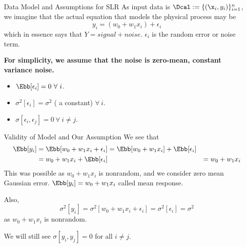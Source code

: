 \documentclass[aspectratio=169,xcolor=dvipsnames,svgnames,x11names,fleqn]{beamer}
\begin{document}
\begin{frame}{Data Model and Assumptions for SLR}
    As input data is $\Dcal:=\{(\x_i, y_i)\}_{i=1}^n$, we imagine that the actual equation that models the physical process may be 
    \begin{equation}
        y_i = (w_0 + w_1 x_i) + \epsilon_i
    \end{equation}
    which in essence says that $ Y = signal + noise$. $\epsilon_i$ is the random error or noise term.

\begin{gradblock}
        \textbf{For simplicity, we assume that the noise is zero-mean, constant variance noise.}
    \begin{itemize}
        \item $\Ebb[\epsilon_i] = 0 ~\forall~ i$.
        \item $\sigma^2[\epsilon_i] = \sigma^2$ ( a constant) $\forall~ i$.
        \item $\sigma[\epsilon_i, \epsilon_j] = 0~\forall~ i\neq j$.
    \end{itemize}
\end{gradblock}
\end{frame}

\begin{frame}{Validity of Model and Our Assumption}
    We see that 
    \begin{equation}
        \begin{aligned}
            \Ebb[y_i] & = \Ebb[w_0 + w_1x_i + \epsilon_i] = \Ebb[w_0 + w_1x_i] + \Ebb[\epsilon_i]\\
            & = w_0 + w_1x_i + \Ebb[\epsilon_i]
            & = w_0 + w_1x_i 
        \end{aligned}
    \end{equation}
    This was possible as $w_0 + w_1x_i $ is nonrandom, and we consider zero mean Gaussian error. $\Ebb[y_i] = w_0 + w_1x_i$ called mean response.

    Also, 
    \begin{equation}
        \sigma^2[y_i] = \sigma^2[w_0 + w_1x_i + \epsilon_i] = \sigma^2[\epsilon_i] = \sigma^2
    \end{equation}
    as $w_0 + w_1x_i $ is nonrandom.

    We will still see $\sigma[y_i, y_j] = 0 $ for all $i\neq j$.
\end{frame}
\end{document}
